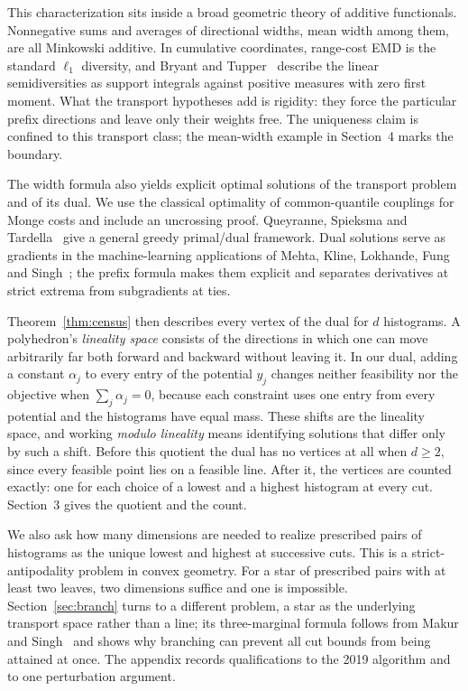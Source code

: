 \documentclass[11pt]{article}
\theoremstyle{definition}\newtheorem{definition}[theorem]{Definition}
\newcommand{\1}{\mathbf 1}
\begin{document}
This characterization sits inside a broad geometric theory of additive
functionals. Nonnegative sums and averages of directional widths, mean width
among them, are all Minkowski additive. In cumulative coordinates, range-cost
EMD is the standard $\ell_1$ diversity, and Bryant and
Tupper~\cite[Section 2.1 and Theorem 5]{bt} describe the linear semidiversities
as support integrals against positive measures with zero first moment. What
the transport hypotheses add is rigidity: they force the particular prefix
directions and leave only their weights free. The uniqueness claim is confined
to this transport class; the mean-width example in Section~4 marks the
boundary.

The width formula also yields explicit optimal solutions of the transport
problem and of its dual. We use the classical optimality of common-quantile
couplings for Monge costs and include an uncrossing proof. Queyranne, Spieksma
and Tardella~\cite[Theorem 3.1(2)--(3)]{qst} give a general greedy primal/dual framework. Dual
solutions serve as gradients in the machine-learning applications of Mehta,
Kline, Lokhande, Fung and Singh~\cite[Theorem 4.3 and Appendix 7.1]{mehta}; the prefix formula makes them
explicit and separates derivatives at strict extrema from subgradients at ties.

Theorem~\ref{thm:census} then describes every vertex of the dual for $d$
histograms. A polyhedron's \emph{lineality space} consists of the directions in
which one can move arbitrarily far both forward and backward without leaving
it. In our dual, adding a constant $\alpha_j$ to every entry of the potential
$y_j$ changes neither feasibility nor the objective when $\sum_j\alpha_j=0$,
because each constraint uses one entry from every potential and the histograms
have equal mass. These shifts are the lineality space, and working
\emph{modulo lineality} means identifying solutions that differ only by such a
shift. Before this quotient the dual has no vertices at all when $d\ge2$, since
every feasible point lies on a feasible line. After it, the vertices are
counted exactly: one for each choice of a lowest and a highest histogram at
every cut. Section~3 gives the quotient and the count.

We also ask how many dimensions are needed to realize prescribed pairs of
histograms as the unique lowest and highest at successive cuts. This is a
strict-antipodality problem in convex geometry. For a star of prescribed pairs
with at least two leaves, two dimensions suffice and one is impossible.
Section~\ref{sec:branch} turns to a different problem, a star as the underlying
transport space rather than a line; its three-marginal formula follows from
Makur and Singh~\cite{makur} and shows why branching can prevent all cut bounds
from being attained at once. The appendix records qualifications to the 2019
algorithm and to one perturbation argument.
\end{document}
